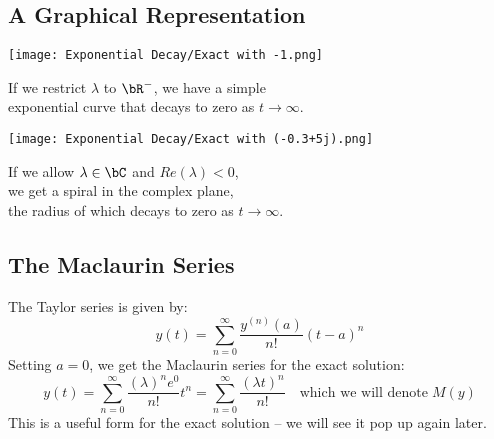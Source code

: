 \subsection{A Graphical Representation}
\begin{multicols}{2}
\begin{center}
\texttt{[image: Exponential Decay/Exact with -1.png]}
\end{center}
\par \hspace*{1cm} If we restrict $\lambda$ to $\bR^{-}$, we have a simple\\
\hspace*{1cm} exponential curve that decays to zero as $t \rightarrow \infty$.\\
\columnbreak{}
\begin{center}
\texttt{[image: Exponential Decay/Exact with (-0.3+5j).png]}
\end{center}
\par \hspace*{1cm} If we allow $\lambda \in \bC$ and $Re(\lambda)<0$,\\
\hspace*{1cm} we get a spiral in the complex plane,\\
\hspace*{1cm} the radius of which decays to zero as $t \rightarrow \infty$.\\
\end{multicols}

\subsection{The Maclaurin Series}
The Taylor series is given by:
\[y(t) = \sum\limits_{n=0}^{\infty} \frac{{y}^{(n)}(a)}{n!}{(t-a)}^n\]
Setting $a=0$, we get the Maclaurin series for the exact solution:
\[y(t) = \sum\limits_{n=0}^{\infty} \frac{{(\lambda)}^n e^0}{n!}t^n = \sum\limits_{n=0}^{\infty} \frac{{(\lambda t)}^n}{n!} \quad\text{which we will denote}\; M(y)\]
This is a useful form for the exact solution -- we will see it pop up again later.


